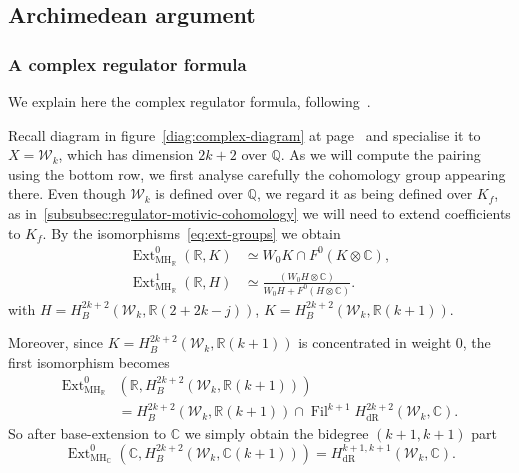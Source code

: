 \documentclass[11pt, a4paper, reqno]{amsart}
\theoremstyle{definition}
\theoremstyle{plain}
\theoremstyle{remark}
\DeclareMathOperator{\Ext}{Ext}
\DeclareMathOperator{\Fil}{Fil}
\DeclareMathOperator{\dR}{dR}
\newcommand{\numberset}{\mathbb}
\newcommand{\C}{\numberset{C}}
\newcommand{\Q}{\numberset{Q}}
\newcommand{\R}{\numberset{R}}
\newcommand{\KS}{\mathscr{W}}
\newcommand{\MH}{\mathrm{MH}}
\begin{document}
\subsection{Archimedean argument}
\label{subsec:complex-argument}
\subsubsection{A complex regulator formula}
\label{subsubsec:complex-formula}
We explain here the complex regulator formula, following~\cite{brunaultchida16,KLZ20}.

Recall diagram in figure~\ref{diag:complex-diagram} at page~\pageref{diag:complex-diagram} and specialise it to $X = \KS_k$, which has dimension $2k+2$ over $\Q$. As we will compute the pairing using the bottom row, we first analyse carefully the cohomology group appearing there. Even though $\KS_k$ is defined over $\Q$, we regard it as being defined over $K_f$, as in~\ref{subsubsec:regulator-motivic-cohomology} we will need to extend coefficients to $K_f$. By the isomorphisms~\eqref{eq:ext-groups} we obtain
\begin{align*}
    \Ext^0_{\MH_\R}(\R, K) &\simeq W_0 K \cap F^0(K \otimes \C), \\
    \Ext^1_{\MH_\R}(\R, H) &\simeq \frac{(W_0 H \otimes \C)}{W_0 H + F^0(H\otimes \C)}.
\end{align*}
with $H = H_B^{2k+2}(\KS_k, \R(2+2k-j))$, $K = H_B^{2k+2}(\KS_k, \R(k+1))$.

 Moreover, since $K = H^{2k+2}_B(\KS_k, \R(k+1))$ is concentrated in weight $0$, the first isomorphism becomes
 \[\begin{split}
      \Ext^0_{\MH_\R}&(\R, H_B^{2k+2}(\KS_k, \R(k+1))) \\
      &= H^{2k+2}_B(\KS_k, \R(k+1)) \cap \Fil^{k+1} H^{2k+2}_{\dR}(\KS_k, \C).
  \end{split}\]
 So after base-extension to $\C$ we simply obtain the bidegree $(k+1,k+1)$ part
 \begin{equation} 
  \label{eq:isomorph-ext-0}
  \Ext^0_{\MH_\C}(\C, H_B^{2k+2}(\KS_k, \C(k+1))) = H^{k+1, k+1}_{\dR}(\KS_k, \C).
 \end{equation}
\end{document}
